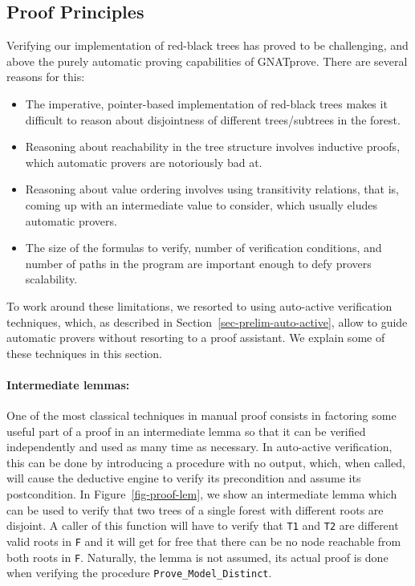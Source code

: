 \documentclass{llncs}
\newcommand{\gnatprove}{GNATprove\xspace}
\begin{document}
\subsection{Proof Principles}


Verifying our implementation of red-black trees has proved to be challenging,
and above the purely automatic proving capabilities of \gnatprove. There
are several reasons for this:

\begin{itemize}
 \item The imperative, pointer-based implementation of red-black trees makes it difficult
 to reason about disjointness of different trees/subtrees in the forest.
 \item Reasoning about reachability in the tree structure involves inductive proofs, which
 automatic provers are notoriously bad at.
 \item Reasoning about value ordering involves using transitivity relations, that is, coming
 up with an intermediate value to consider, which usually eludes automatic provers.
 \item The size of the formulas to verify, number of verification conditions, and number of
 paths in the program are important enough to defy provers scalability.
\end{itemize}

To work around these limitations, we resorted to using auto-active verification techniques, which,
as described in Section~\ref{sec-prelim-auto-active}, allow to guide automatic provers without
resorting to a proof assistant. We explain some of these techniques in this section.

\paragraph{Intermediate lemmas:}
One of the most classical techniques in manual proof consists in factoring some useful
part of a proof in an intermediate lemma so that it can be verified independently and
used as many time as necessary. In auto-active verification, this can be done by introducing
a procedure with no output, which, when called, will cause the deductive engine to verify
its precondition and assume its postcondition. In Figure~\ref{fig-proof-lem}, we show an
intermediate lemma which can be used to verify that two trees of a single forest with different
roots are disjoint. A caller of this function will have to verify that \texttt{T1} and \texttt{T2} are different
valid roots in \texttt{F} and it will get for free that there can be no node reachable from both roots in \texttt{F}.
Naturally, the lemma is not assumed, its actual proof is done when verifying the procedure
\texttt{Prove\_Model\_Distinct}.
\end{document}
